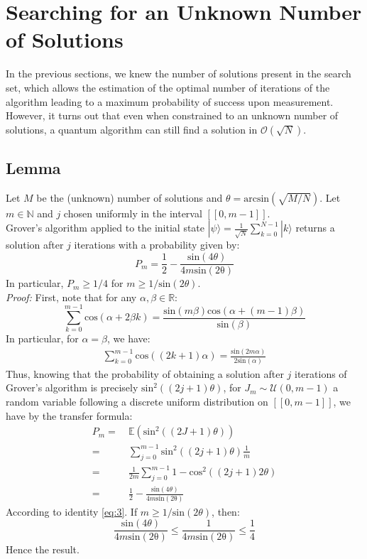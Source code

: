 \section{Searching for an Unknown Number of Solutions}
\label{part3}

In the previous sections, we knew the number of solutions present in the search set, which allows the estimation of the optimal number of iterations of the algorithm leading to a maximum probability of success upon measurement. However, it turns out that even when constrained to an unknown number of solutions, a quantum algorithm can still find a solution in $\mathcal{O}(\sqrt{N})$. \cite{brassard2002quantum}

\subsection{Lemma}
\label{Lemma}

Let $M$ be the (unknown) number of solutions and $\theta = \mathrm{arcsin}(\sqrt{M/N})$. Let $m \in \mathbb{N}$ and $j$ chosen uniformly in the interval $[\![0, m-1]\!]$.
\\
Grover's algorithm applied to the initial state $| \psi \rangle = \frac{1}{\sqrt{N}} \sum_{k=0}^{N-1} |k\rangle$ returns a solution after $j$ iterations with a probability given by:
\[P_m = \frac{1}{2} - \frac{\mathrm{sin}(4\theta)}{4m\mathrm{sin(2\theta)}}\]
In particular, $P_m \geq 1/4$ for $m \geq 1/\mathrm{sin}(2\theta)$.
\\
\textit{Proof:} First, note that for any $\alpha, \beta \in \mathbb{R}$:
\[ \sum_{k=0}^{m-1}\mathrm{cos}(\alpha + 2\beta k) = \frac{\mathrm{sin}(m\beta)\mathrm{cos}(\alpha+(m-1)\beta)}{\mathrm{sin}(\beta)}\]
In particular, for $\alpha=\beta$, we have:
\begin{align}
\sum_{k=0}^{m-1}\mathrm{cos}((2k+1)\alpha) = \frac{\mathrm{sin}(2m\alpha)}{2\mathrm{sin}(\alpha)}
\label{eq:3}
\end{align}
Thus, knowing that the probability of obtaining a solution after $j$ iterations of Grover's algorithm is precisely $\mathrm{sin}^2((2j+1)\theta)$, for $J_m \sim \mathcal{U}(0,m-1)$ a random variable following a discrete uniform distribution on $[\![0,m-1]\!]$, we have by the transfer formula:
\begin{align*}
P_m =&\ \mathbb{E}(\mathrm{sin}^2((2J+1)\theta)) \\
=&\ \sum_{j=0}^{m-1}\mathrm{sin}^2((2j+1)\theta) \frac{1}{m} \\
=&\ \frac{1}{2m} \sum_{j=0}^{m-1}1 - \mathrm{cos}^2((2j+1)2\theta) \\
=&\ \frac{1}{2} - \frac{\mathrm{sin}(4\theta)}{4m\mathrm{sin(2\theta)}}
\end{align*}
According to identity \eqref{eq:3}. If $m \geq 1/\mathrm{sin}(2\theta)$, then:
\[\frac{\mathrm{sin}(4\theta)}{4m\mathrm{sin(2\theta)}} \leq \frac{1}{4m\mathrm{sin(2\theta)}} \leq \frac{1}{4}\]
Hence the result.

